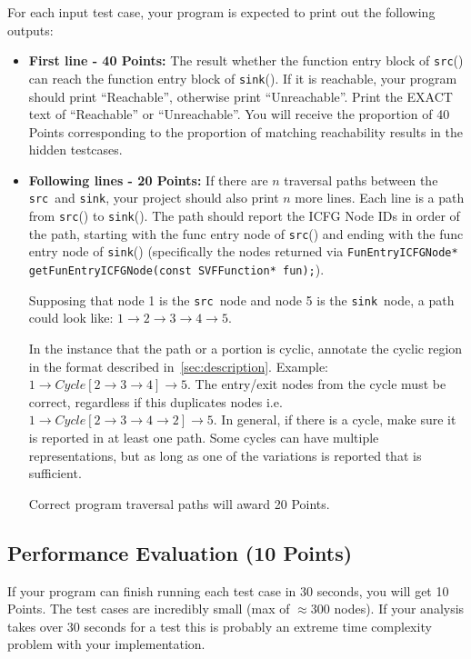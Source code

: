 \documentclass[12pt]{article}
\newcommand{\codeIn}[1]{{\small\tt{#1}}}
\newcommand{\src}{\codeIn{src}}
\newcommand{\sink}{\codeIn{sink}}
\begin{document}
For each input test case, your program is expected to print out the following outputs:
\begin{itemize}
    \item \textbf{First line - 40 Points:} The result whether the function entry block of \src () can reach the function entry block of \sink (). If it is reachable, your program should print ``Reachable'', otherwise print  ``Unreachable''. Print the EXACT text of ``Reachable'' or ``Unreachable''. You will receive the proportion of 40 Points corresponding to the proportion of matching reachability results in the hidden testcases.
    \item \textbf{Following lines - 20 Points:} If there are $n$ traversal paths between the \src\  and \sink, your project should also print $n$ more lines. Each line 
    is a path from \src () to \sink (). The path should report the ICFG Node IDs in order of the path, starting with the func entry node of \src () and ending with the func entry node of \sink () (specifically the nodes returned via \codeIn{FunEntryICFGNode* getFunEntryICFGNode(const SVFFunction* fun);}).
    
    Supposing that node 1 is the \src\  node and node 5 is the \sink\  node, a path could look like: \codeIn{$1\xrightarrow{}2\xrightarrow{}3\xrightarrow{}4\xrightarrow{}5$}. 
    
    In the instance that the path or a portion is cyclic, annotate the cyclic region in the format described in~\ref{sec:description}. Example: \codeIn{$1\xrightarrow{}Cycle[2\xrightarrow{}3\xrightarrow{}4]\xrightarrow{}5$}. The entry/exit nodes from the cycle must be correct, regardless if this duplicates nodes i.e. \codeIn{$1\xrightarrow{}Cycle[2\xrightarrow{}3\xrightarrow{}4\xrightarrow{}2]\xrightarrow{}5$}. In general, if there is a cycle, make sure it is reported in at least one path. Some cycles can have multiple representations, but as long as one of the variations is reported that is sufficient.
    
    Correct program traversal paths will award 20 Points.
\end{itemize}

\subsection{Performance Evaluation (10 Points)}\label{sec:eval}
If your program can finish running each test case in 30 seconds, you will get 10 Points. The test cases are incredibly small (max of $\approx$300 nodes). If your analysis takes over 30 seconds for a test this is probably an extreme time complexity problem with your implementation.
\end{document}
